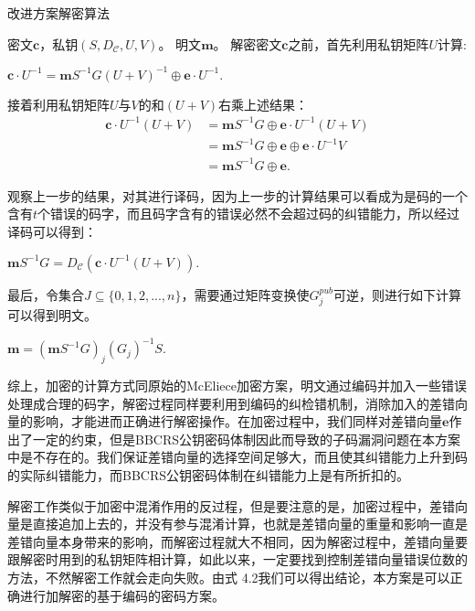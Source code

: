 \begin{breakablealgorithm}
	\small
	\renewcommand{\algorithmicrequire}{\textbf{Input:}}
	\renewcommand{\algorithmicensure}{\textbf{Output:}}
	\caption{改进方案解密算法}
	\label{alg:NewDe}
	\begin{algorithmic}[1]
		\Require
		密文$\mathbf{c}$，私钥$(S,D_\mathcal{C},U,V)$。
		\Ensure
		明文$\mathbf{m}$。
		\State
		解密密文$\mathbf{c}$之前，首先利用私钥矩阵$U$计算:
		\begin{center}
			$\textbf{c}\cdot U^{-1} = \textbf{m}S^{-1}G(U+V)^{-1} \oplus\textbf{e}\cdot U^{-1}.$
		\end{center}
		\State
		接着利用私钥矩阵$U$与$V$的和$(U + V)$右乘上述结果：
		\begin{equation}
			\begin{aligned}
				\textbf{c}\cdot U^{-1}(U+V) &= \textbf{m}S^{-1}G \oplus\textbf{e}\cdot U^{-1}(U+V) \\
				& = \textbf{m}S^{-1}G \oplus  \textbf{e} \oplus \textbf{e}\cdot U^{-1}V \\
				& = \textbf{m}S^{-1}G \oplus  \textbf{e}.
			\end{aligned}
		\end{equation}
		
		\State
		观察上一步的结果，对其进行译码，因为上一步的计算结果可以看成为是码的一个含有$t$个错误的码字，而且码字含有的错误必然不会超过码的纠错能力，所以经过译码可以得到：
		\begin{center}
			$\mathbf{m}S^{-1}G = D_\mathcal{C}(\textbf{c}\cdot U^{-1}(U+V)).$
		\end{center}
		
		\State
		最后，令集合$J \subseteq \{0,1,2,...,n\}$，需要通过矩阵变换使$G_j^{pub}$可逆，则进行如下计算可以得到明文。
		\begin{center}
			$\mathbf{m} = (\mathbf{m}S^{-1}G)_j(G_j)^{-1}S.$
		\end{center}		
	\end{algorithmic}
\end{breakablealgorithm}

综上，加密的计算方式同原始的McEliece加密方案，明文通过编码并加入一些错误处理成合理的码字，解密过程同样要利用到编码的纠检错机制，消除加入的差错向量的影响，才能进而正确进行解密操作。在加密过程中，我们同样对差错向量$\mathbf{e}$作出了一定的约束，但是BBCRS公钥密码体制因此而导致的子码漏洞问题在本方案中是不存在的。我们保证差错向量的选择空间足够大，而且使其纠错能力上升到码的实际纠错能力，而BBCRS公钥密码体制在纠错能力上是有所折扣的。

解密工作类似于加密中混淆作用的反过程，但是要注意的是，加密过程中，差错向量是直接追加上去的，并没有参与混淆计算，也就是差错向量的重量和影响一直是差错向量本身带来的影响，而解密过程就大不相同，因为解密过程中，差错向量要跟解密时用到的私钥矩阵相计算，如此以来，一定要找到控制差错向量错误位数的方法，不然解密工作就会走向失败。由式 4.2我们可以得出结论，本方案是可以正确进行加解密的基于编码的密码方案。

